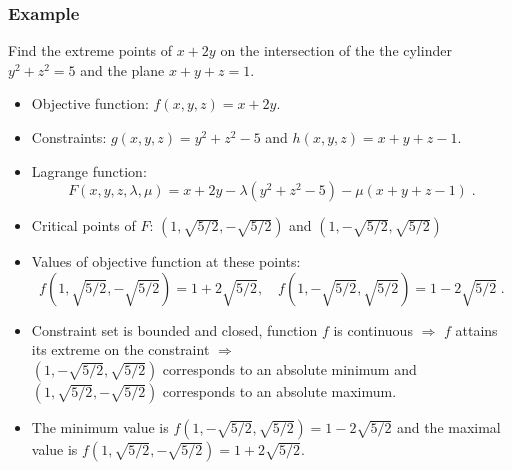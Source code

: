 \begin{frame}
  \frametitle{Example}

  Find the extreme points of $x+2y$ on the intersection of the the cylinder $y^2+z^2=5$ and the plane $x+y+z=1$.

\begin{itemize}
  \item \pause Objective function: \pause $f(x,y,z) = x+2y$.
  \item \pause Constraints: \pause $g(x,y,z) = y^2+z^2-5$ and $h(x,y,z) = x+y+z-1$.
  \item \pause Lagrange function:\pause
  $$F(x,y,z,\lambda,\mu) = x+2y - \lambda (y^2+z^2-5)- \mu (x+y+z-1)\; .$$
  \item \pause Critical points of $F$: \pause $(1,\sqrt{5/2},-\sqrt{5/2})$ and $(1,-\sqrt{5/2},\sqrt{5/2})$
\item \pause Values of objective function at these points:\pause
  $$f(1,\sqrt{5/2},-\sqrt{5/2}) = 1+2\sqrt{5/2}, \quad  f(1,-\sqrt{5/2},\sqrt{5/2}) = 1-2\sqrt{5/2}\; .$$
  \item \pause Constraint set is bounded and closed, function $f$ is continuous $\Longrightarrow$
       $f$ attains its extreme on the constraint $\Longrightarrow$\\
       $(1,-\sqrt{5/2},\sqrt{5/2})$ corresponds to an absolute minimum and $(1,\sqrt{5/2},-\sqrt{5/2})$ corresponds to an absolute maximum.
  \item The minimum value is $f(1,-\sqrt{5/2},\sqrt{5/2}) = 1-2\sqrt{5/2}$ and the maximal value is $f(1,\sqrt{5/2},-\sqrt{5/2})=1+2\sqrt{5/2}$.
\end{itemize}
\end{frame}